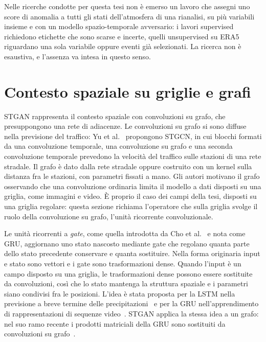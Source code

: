 Nelle ricerche condotte per questa tesi non è emerso un lavoro che assegni uno score di anomalia a tutti gli stati dell'atmosfera di una rianalisi, su più variabili insieme e con un modello spazio-temporale avversario: i lavori supervised richiedono etichette che sono scarse e incerte, quelli unsupervised su ERA5 riguardano una sola variabile oppure eventi già selezionati. La ricerca non è esaustiva, e l'assenza va intesa in questo senso.

\section{Contesto spaziale su griglie e grafi}
\label{sec:rw-spazio}

STGAN rappresenta il contesto spaziale con convoluzioni su grafo, che presuppongono una rete di adiacenze. Le convoluzioni su grafo si sono diffuse nella previsione del traffico: Yu et al.~\cite{yu2018stgcn} propongono STGCN, in cui blocchi formati da una convoluzione temporale, una convoluzione su grafo e una seconda convoluzione temporale prevedono la velocità del traffico sulle stazioni di una rete stradale. Il grafo è dato dalla rete stradale oppure costruito con un kernel sulla distanza fra le stazioni, con parametri fissati a mano. Gli autori motivano il grafo osservando che una convoluzione ordinaria limita il modello a dati disposti su una griglia, come immagini e video. È proprio il caso dei campi della tesi, disposti su una griglia regolare: questa sezione richiama l'operatore che sulla griglia svolge il ruolo della convoluzione su grafo, l'unità ricorrente convoluzionale.

Le unità ricorrenti a \emph{gate}, come quella introdotta da Cho et al.~\cite{cho2014gru} e nota come GRU, aggiornano uno stato nascosto mediante gate che regolano quanta parte dello stato precedente conservare e quanta sostituire. Nella forma originaria input e stato sono vettori e i gate sono trasformazioni dense. Quando l'input è un campo disposto su una griglia, le trasformazioni dense possono essere sostituite da convoluzioni, così che lo stato mantenga la struttura spaziale e i parametri siano condivisi fra le posizioni. L'idea è stata proposta per la LSTM nella previsione a breve termine delle precipitazioni~\cite{shi2015convlstm} e per la GRU nell'apprendimento di rappresentazioni di sequenze video~\cite{ballas2016convgru}. STGAN applica la stessa idea a un grafo: nel suo ramo recente i prodotti matriciali della GRU sono sostituiti da convoluzioni su grafo~\cite{deng2022stgan}.

